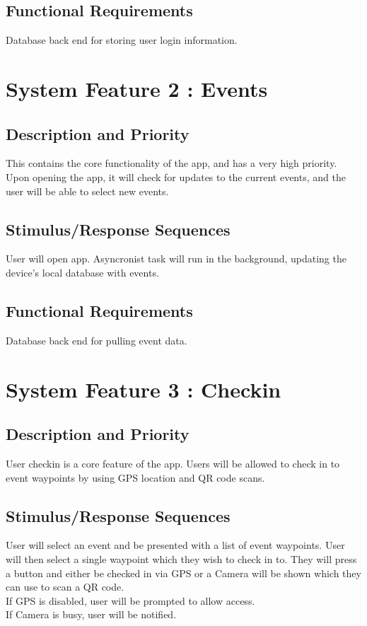 \documentclass{scrreprt}
\begin{document}
\subsection{Functional Requirements}
Database back end for storing user login information.

\section{System Feature 2 : Events}

\subsection{Description and Priority}
This contains the core functionality of the app, and has a very high priority. Upon opening 
the app, it will check for updates to the current events, and the user will be able to 
select new events.

\subsection{Stimulus/Response Sequences}
User will open app. Asyncronist task will run in the background, updating the device's
local database with events.

\subsection{Functional Requirements}
Database back end for pulling event data.

\section{System Feature 3 : Checkin}

\subsection{Description and Priority}
User checkin is a core feature of the app. Users will be allowed to check in to event waypoints
by using GPS location and QR code scans.

\subsection{Stimulus/Response Sequences}
User will select an event and be presented with a list of event waypoints. User will then
select a single waypoint which they wish to check in to. They will press a button and either
be checked in via GPS or a Camera will be shown which they can use to scan a QR code. \\
If GPS is disabled, user will be prompted to allow access. \\
If Camera is busy, user will be notified.
\end{document}
